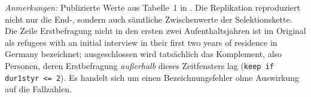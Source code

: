 \begin{table}[htbp]
  \vspace{0.75ex}
  \parbox{\textwidth}{\footnotesize
    \textit{Anmerkungen:} Publizierte Werte aus Tabelle~1 in
    \textcite[15]{Kanas:2023}. Die Replikation reproduziert nicht nur die End-,
    sondern auch s\"amtliche Zwischenwerte der Selektionskette. Die Zeile
    \glqq Erstbefragung nicht in den ersten zwei Aufenthaltsjahren\grqq{} ist im
    Original als \glqq refugees with an initial interview in their first two years
    of residence in Germany\grqq{} bezeichnet; ausgeschlossen wird tats\"achlich
    das Komplement, also Personen, deren Erstbefragung \emph{au{\ss}erhalb} dieses
    Zeitfensters lag (\texttt{keep if dur1styr <= 2}). Es handelt sich um einen
    Bezeichnungsfehler ohne Auswirkung auf die Fallzahlen.}
\end{table}
\fi
